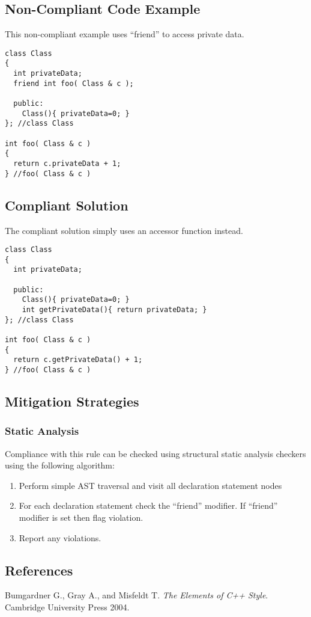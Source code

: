 \subsection{Non-Compliant Code Example}
This non-compliant example uses ``friend'' to access private data.

\begin{verbatim}
class Class
{
  int privateData;
  friend int foo( Class & c );

  public:
    Class(){ privateData=0; }
}; //class Class

int foo( Class & c )
{
  return c.privateData + 1;
} //foo( Class & c )
\end{verbatim}

\subsection{Compliant Solution}
The compliant solution simply uses an accessor function instead.

\begin{verbatim}
class Class
{
  int privateData;

  public:
    Class(){ privateData=0; }
    int getPrivateData(){ return privateData; }
}; //class Class

int foo( Class & c )
{
  return c.getPrivateData() + 1;
} //foo( Class & c )
\end{verbatim}

\subsection{Mitigation Strategies}
\subsubsection{Static Analysis} 

Compliance with this rule can be checked using structural static analysis checkers using the following algorithm:

\begin{enumerate}
\item Perform simple AST traversal and visit all declaration statement nodes
\item For each declaration statement check the ``friend'' modifier. If ``friend'' modifier is set then flag violation.
\item Report any violations. 
\end{enumerate}

\subsection{References}

Bumgardner G., Gray A., and Misfeldt T. {\it The Elements of C++ Style}. Cambridge University Press 2004.
